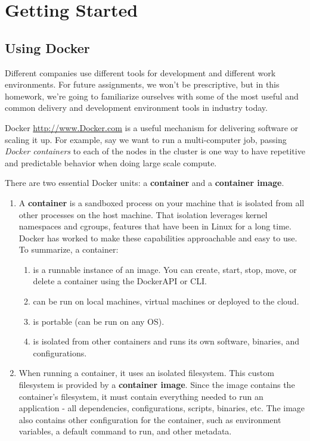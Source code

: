 \documentclass{cs6220-assignment}
\begin{document}

\section{Getting Started}
\subsection{Using Docker}


Different companies use different tools for development and different work environments. For future assignments, we won't be prescriptive, but in this homework, we're going to familiarize ourselves with some of the most useful and common delivery and development environment tools in industry today.

Docker \url{http://www.Docker.com} is a  useful mechanism for delivering software or scaling it up. For example, say we want to run a multi-computer job, passing \emph{Docker containers} to each of the nodes in the cluster is one way to have repetitive and predictable behavior when doing large scale compute.

There are two essential Docker units: a \textbf{container} and a \textbf{container image}.

\begin{enumerate}
    \item A \textbf{container} is a sandboxed process on your machine that is isolated from all other processes on the host machine. That isolation leverages kernel namespaces and cgroups, features that have been in Linux for a long time. Docker has worked to make these capabilities approachable and easy to use. To summarize, a container:
    \begin{enumerate}
        \item is a runnable instance of an image. You can create, start, stop, move, or delete a container using the DockerAPI or CLI. 
        \item can be run on local machines, virtual machines or deployed to the cloud.
        \item is portable (can be run on any OS).
        \item is isolated from other containers and runs its own software, binaries, and configurations.
    \end{enumerate}

    \item When running a container, it uses an isolated filesystem. This custom filesystem is provided by a \textbf{container image}. Since the image contains the container’s filesystem, it must contain everything needed to run an application - all dependencies, configurations, scripts, binaries, etc. The image also contains other configuration for the container, such as environment variables, a default command to run, and other metadata.
\end{enumerate}
\end{document}

